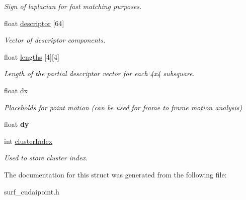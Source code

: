 \begin{DoxyCompactItemize}
\begin{DoxyCompactList}\small\item\em Sign of laplacian for fast matching purposes. \end{DoxyCompactList}\item 
\hypertarget{structsurf__cudaIpoint_ac4305e940d8ec627611b2dbbd046b255}{float \hyperlink{structsurf__cudaIpoint_ac4305e940d8ec627611b2dbbd046b255}{descriptor} \mbox{[}64\mbox{]}}\label{structsurf__cudaIpoint_ac4305e940d8ec627611b2dbbd046b255}

\begin{DoxyCompactList}\small\item\em Vector of descriptor components. \end{DoxyCompactList}\item 
\hypertarget{structsurf__cudaIpoint_a528e3bb27300a770f8e96a1b20444a24}{float \hyperlink{structsurf__cudaIpoint_a528e3bb27300a770f8e96a1b20444a24}{lengths} \mbox{[}4\mbox{]}\mbox{[}4\mbox{]}}\label{structsurf__cudaIpoint_a528e3bb27300a770f8e96a1b20444a24}

\begin{DoxyCompactList}\small\item\em Length of the partial descriptor vector for each 4x4 subsquare. \end{DoxyCompactList}\item 
\hypertarget{structsurf__cudaIpoint_a69807c4d83b9fa5c86abcfe26a4dab78}{float \hyperlink{structsurf__cudaIpoint_a69807c4d83b9fa5c86abcfe26a4dab78}{dx}}\label{structsurf__cudaIpoint_a69807c4d83b9fa5c86abcfe26a4dab78}

\begin{DoxyCompactList}\small\item\em Placeholds for point motion (can be used for frame to frame motion analysis) \end{DoxyCompactList}\item 
\hypertarget{structsurf__cudaIpoint_a45ebbb0b1cd46e8bb20529ff6d540c20}{float {\bfseries dy}}\label{structsurf__cudaIpoint_a45ebbb0b1cd46e8bb20529ff6d540c20}

\item 
\hypertarget{structsurf__cudaIpoint_a8f046ba66623a6f30a26b8aa3073fa41}{int \hyperlink{structsurf__cudaIpoint_a8f046ba66623a6f30a26b8aa3073fa41}{cluster\-Index}}\label{structsurf__cudaIpoint_a8f046ba66623a6f30a26b8aa3073fa41}

\begin{DoxyCompactList}\small\item\em Used to store cluster index. \end{DoxyCompactList}\end{DoxyCompactItemize}


The documentation for this struct was generated from the following file\-:\begin{DoxyCompactItemize}
\item 
surf\-\_\-cudaipoint.\-h\end{DoxyCompactItemize}
